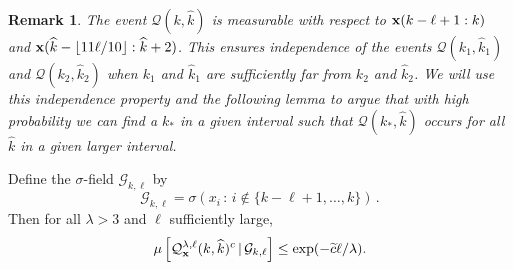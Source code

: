 \documentclass[final,12pt]{colt2018} %
\newtheorem*{unremark}{Remark}
\newcommand{\1}{\mathbf{1}}
\def\cG{\mathcal{G}}
\newcommand{\eqb}{\begin{equation}}
\newcommand{\eqe}{\end{equation}}
\newcommand{\wt}{\widetilde}
\newcommand{\wh}{\widehat}
\newcommand{\mcl}{\mathcal}
\def\x{{\bf x}}
\def\ct{{\wt c}}
\def\Rhat{{\mathcal Q}}
\begin{document}
\begin{unremark}
	The event $\Rhat (k,\wh k)$ is measurable with respect to
	$\x (k - \ell + 1 : k)$ and $\x (\wh k - \lfloor 11 \ell / 10
	\rfloor : \wh k+2)$.  This ensures independence of the events
	$\Rhat (k_1 , \wh k_1)$ and $\Rhat (k_2 , \wh k_2)$ when $k_1$
	and $\wh k_1$ are sufficiently far from $k_2$ and $\wh k_2$.
	We will use this independence property and the following lemma
	to argue that with high probability we can find a $k_*$ in a
	given interval such that $\Rhat (k_*,\wh k)$ occurs for all
	$\wh k$ in a given larger interval.
\end{unremark}

\begin{lemma} \label{prop9}
	Define the $\sigma$-field $\cG_{k,\ell}$ by
	$$\cG_{k , \ell} = \sigma( x_i \, : \, i \not\in \{ k-\ell + 1 , \dots,
	k \}) \, .$$
	Then for all $\lambda>3$ and $\ell$ sufficiently large,
	\eqb \label{eq1}
	\mu \left [ \Rhat_\x^{\lambda,\ell} (k , \wh k)^c \, | \, \mcl G_{k,\ell}
	\right ] \leq \exp(- \ct \ell / \lambda).
	\eqe
\end{lemma}
\end{document}
